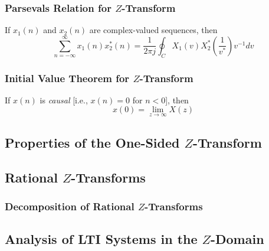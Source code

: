 \subsubsection{Parsevals Relation for \texorpdfstring{$Z$-Transform}{Z-Transform}}\label{subsubsec:Parsevals Relation for Z-Transform}
If $x_{1}(n)$ and $x_{2}(n)$ are complex-valued sequences, then
\begin{equation}\label{eq:Parsevals Relation for Z-Transform}
  \sum\limits_{n=-\infty}^{\infty} x_{1}(n)x_{2}^{*}(n) = \frac{1}{2 \pi j} \oint_{C} X_{1}(v)X_{2}^{*} \left( \frac{1}{v^{*}} \right) v^{-1} dv
\end{equation}

\subsubsection{Initial Value Theorem for \texorpdfstring{$Z$-Transform}{Z-Transform}}\label{subsubsec:Initial Value Theorem for Z-Transform}
If $x(n)$ is \emph{causal} [i.e., $x(n)=0$ for $n<0$], then
\begin{equation}\label{eq:Initial Value Theorem for Z-Transform}
  x(0) = \lim\limits_{z\rightarrow\infty}X(z)
\end{equation}

\subsection{Properties of the One-Sided \texorpdfstring{$Z$-Transform}{Z-Transform}}\label{subsec:One-Sided Z-Transform Properties}
\begin{propertylist}
\item 
\end{propertylist}

\subsection{Rational \texorpdfstring{$Z$-Transforms}{Z-Transform}}\label{subsec:Rational Z-Transforms}
\subsubsection{Decomposition of Rational \texorpdfstring{$Z$-Transforms}{Z-Transform}}\label{subsubsec:Decompose Rational Z-Transforms}

\subsection{Analysis of LTI Systems in the \texorpdfstring{$Z$-Domain}{Z-Transform}}\label{subsec:Analysis LTI Systems Z-Domain}

